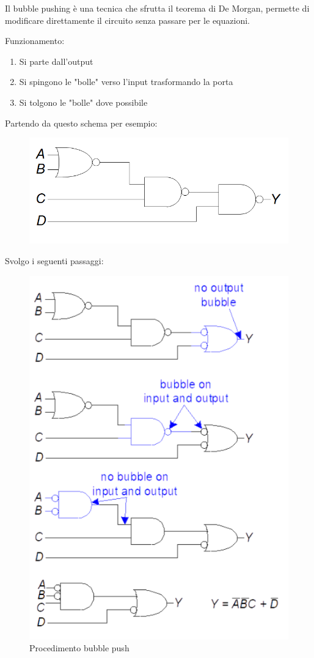 \documentclass{article}
\begin{document}
Il bubble pushing è una tecnica che sfrutta il teorema di De Morgan, permette di modificare direttamente il circuito senza passare per le equazioni.\newline

Funzionamento:
\begin{enumerate}
    \item Si parte dall'output
    \item Si spingono le "bolle" verso l'input trasformando la porta
    \item Si tolgono le "bolle" dove possibile
\end{enumerate}

\vspace{4pt}

Partendo da questo schema per esempio:
\begin{figure}[ht]
    \centering
    \includegraphics[width=0.52\linewidth]{bpush.png}
    \label{fig:bub_push}
\end{figure}

Svolgo i seguenti passaggi: 

\begin{figure}[ht]
    \centering
    \includegraphics[width=0.52\linewidth]{bpush2.png}
    \caption{Procedimento bubble push}
    \label{fig:bub_push2}
\end{figure}
\end{document}
